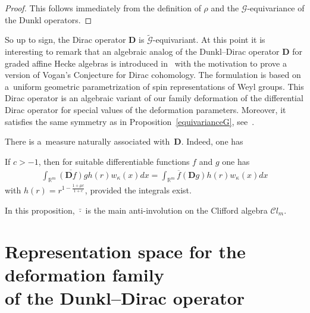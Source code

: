 \documentclass[pdftex]{sigma}
\numberwithin{equation}{section}
\numberwithin{theorem}{section}
\numberwithin{proposition}{section}
\numberwithin{lemma}{section}
\numberwithin{corollary}{section}
\numberwithin{definition}{section}
\numberwithin{example}{section}
\numberwithin{remark}{section}
\numberwithin{note}{section}
\theoremstyle{remark}
\newcommand{\mR}{\mathbb{R}}
\newcommand{\cC}{\mathcal{C}}
\newcommand{\cG}{\mathcal{G}}
\newcommand{\dD}{\textbf{D}}
\def\k{{\kappa}}
\begin{document}
\begin{proof}
This follows immediately from the def\/inition of $\rho$ and the $\cG$-equivariance of the Dunkl
operators.
\end{proof}

So up to sign, the Dirac operator $\dD$ is $\widetilde{\cG}$-equivariant.
At this point it is interesting to remark that an algebraic analog of the Dunkl--Dirac operator
$\dD$ for
graded af\/f\/ine Hecke algebras is introduced in~\cite{BCT} with the motivation to prove
a version of Vogan's Conjecture for Dirac cohomology.
The formulation is based on a~uniform geometric parametrization of spin
representations of Weyl groups.
This Dirac operator is an algebraic variant of our family deformation of the dif\/ferential Dirac
operator
for special values of the deformation parameters.
Moreover, it satisf\/ies the same symmetry as in Proposition~\ref{equivarianceG}, see~\cite[Lemma~3.4]{BCT}.

There is a~measure naturally associated with~$\dD$.
Indeed, one has

\begin{proposition}\label{partIntProp}
If $c>-1$, then for suitable differentiable functions $f$ and $g$ one has
\begin{gather*}
\int_{\mR^{m}}\overline{(\dD f)}g h(r)w_{\kappa}(x)dx=\int_{\mR^{m}}\overline{f}
(\dD g)h(r)w_{\k}(x)dx
\end{gather*}
with $h(r)=r^{1-\frac{1+\mu c}{1+c}}$, provided the integrals exist.
\end{proposition}
In this proposition, $\bar{\cdot}$ is the main anti-involution on the Clif\/ford algebra $\cC l_{m}$.

\section[Representation space for the deformation family of the Dunkl-Dirac
operator]{Representation space for the deformation family\\ of the Dunkl--Dirac
operator}\label{section4}
\end{document}
